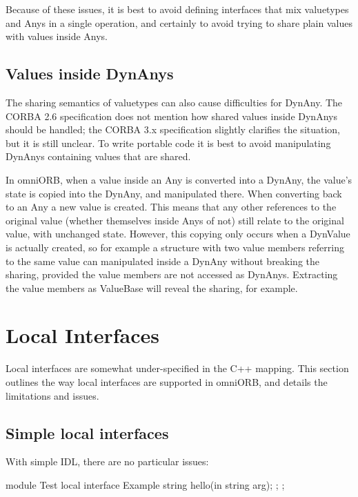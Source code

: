 \documentclass[11pt,twoside,a4paper]{book}
\begin{document}
Because of these issues, it is best to avoid defining interfaces that
mix valuetypes and Anys in a single operation, and certainly to avoid
trying to share plain values with values inside Anys.


\subsection{Values inside DynAnys}

The sharing semantics of valuetypes can also cause difficulties for
DynAny. The CORBA 2.6 specification does not mention how shared values
inside DynAnys should be handled; the CORBA 3.x specification slightly
clarifies the situation, but it is still unclear. To write portable
code it is best to avoid manipulating DynAnys containing values that
are shared.

In omniORB, when a value inside an Any is converted into a DynAny, the
value's state is copied into the DynAny, and manipulated there. When
converting back to an Any a new value is created. This means that any
other references to the original value (whether themselves inside Anys
of not) still relate to the original value, with unchanged state.
However, this copying only occurs when a DynValue is actually created,
so for example a structure with two value members referring to the
same value can manipulated inside a DynAny without breaking the
sharing, provided the value members are not accessed as DynAnys.
Extracting the value members as ValueBase will reveal the sharing, for
example.


\section{Local Interfaces}
\label{sec:LocalInterfaces}

Local interfaces are somewhat under-specified in the C++ mapping. This
section outlines the way local interfaces are supported in omniORB,
and details the limitations and issues.

\subsection{Simple local interfaces}

With simple IDL, there are no particular issues:

\begin{idllisting}
module Test {
  local interface Example {
    string hello(in string arg);
  };
};
\end{idllisting}
\end{document}
